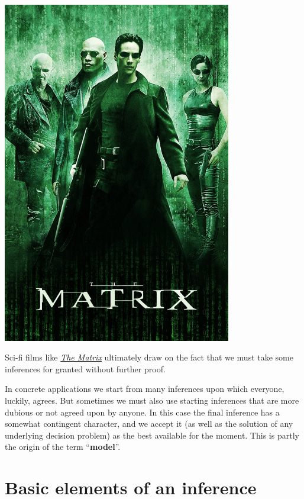 \documentclass[
  a4paper,
  DIV=11,
  numbers=noendperiod,
  oneside]{scrreprt}
\begin{document}
\begin{marginfigure}

{\centering \includegraphics[width=0.75\textwidth,height=\textheight]{the_matrix.jpg}

}

\caption{Sci-fi films like
\href{https://www.themoviedb.org/movie/603-the-matrix}{\emph{The
Matrix}} ultimately draw on the fact that we must take some inferences
for granted without further proof.}

\end{marginfigure}

\hfill\break

In concrete applications we start from many inferences upon which
everyone, luckily, agrees. But sometimes we must also use starting
inferences that are more dubious or not agreed upon by anyone. In this
case the final inference has a somewhat contingent character, and we
accept it (as well as the solution of any underlying decision problem)
as the best available for the moment. This is partly the origin of the
term ``{\textbf{model}}''.

\hypertarget{basic-elements-of-an-inference}{%
\section{Basic elements of an
inference}\label{basic-elements-of-an-inference}}
\end{document}
